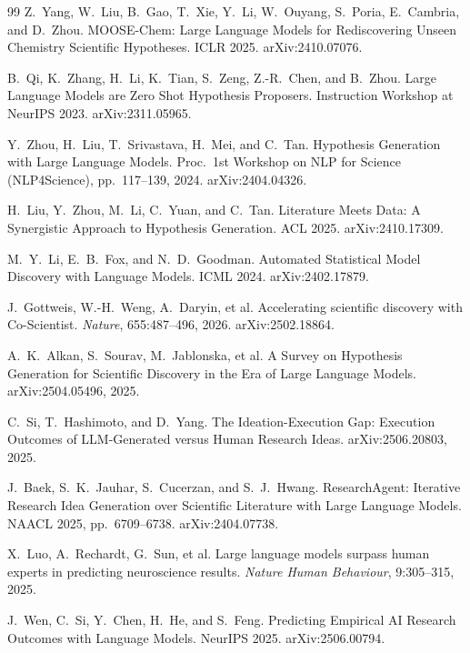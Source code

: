 \documentclass[11pt]{article}
\begin{document}
\begin{thebibliography}{99}
 Z.~Yang, W.~Liu, B.~Gao, T.~Xie, Y.~Li, W.~Ouyang, S.~Poria, E.~Cambria, and D.~Zhou.
\newblock MOOSE-Chem: Large Language Models for Rediscovering Unseen Chemistry Scientific Hypotheses.
\newblock ICLR 2025. arXiv:2410.07076.

 B.~Qi, K.~Zhang, H.~Li, K.~Tian, S.~Zeng, Z.-R.~Chen, and B.~Zhou.
\newblock Large Language Models are Zero Shot Hypothesis Proposers.
\newblock Instruction Workshop at NeurIPS 2023. arXiv:2311.05965.

 Y.~Zhou, H.~Liu, T.~Srivastava, H.~Mei, and C.~Tan.
\newblock Hypothesis Generation with Large Language Models.
\newblock Proc.\ 1st Workshop on NLP for Science (NLP4Science), pp.~117--139, 2024. arXiv:2404.04326.

 H.~Liu, Y.~Zhou, M.~Li, C.~Yuan, and C.~Tan.
\newblock Literature Meets Data: A Synergistic Approach to Hypothesis Generation.
\newblock ACL 2025. arXiv:2410.17309.

 M.~Y.~Li, E.~B.~Fox, and N.~D.~Goodman.
\newblock Automated Statistical Model Discovery with Language Models.
\newblock ICML 2024. arXiv:2402.17879.

 J.~Gottweis, W.-H.~Weng, A.~Daryin, et al.
\newblock Accelerating scientific discovery with Co-Scientist.
\newblock \emph{Nature}, 655:487--496, 2026. arXiv:2502.18864.

 A.~K.~Alkan, S.~Sourav, M.~Jablonska, et al.
\newblock A Survey on Hypothesis Generation for Scientific Discovery in the Era of Large Language Models.
\newblock arXiv:2504.05496, 2025.

 C.~Si, T.~Hashimoto, and D.~Yang.
\newblock The Ideation-Execution Gap: Execution Outcomes of LLM-Generated versus Human Research Ideas.
\newblock arXiv:2506.20803, 2025.

 J.~Baek, S.~K.~Jauhar, S.~Cucerzan, and S.~J.~Hwang.
\newblock ResearchAgent: Iterative Research Idea Generation over Scientific Literature with Large
Language Models.
\newblock NAACL 2025, pp.~6709--6738. arXiv:2404.07738.

 X.~Luo, A.~Rechardt, G.~Sun, et al.
\newblock Large language models surpass human experts in predicting neuroscience results.
\newblock \emph{Nature Human Behaviour}, 9:305--315, 2025.

 J.~Wen, C.~Si, Y.~Chen, H.~He, and S.~Feng.
\newblock Predicting Empirical AI Research Outcomes with Language Models.
\newblock NeurIPS 2025. arXiv:2506.00794.


\end{thebibliography}
\end{document}
